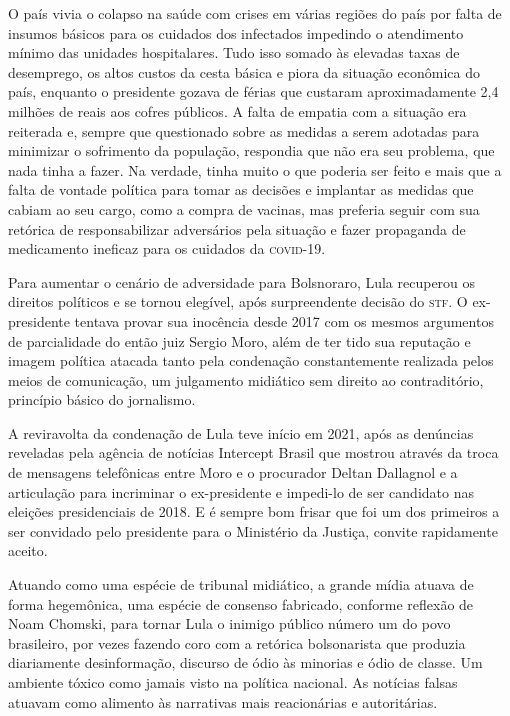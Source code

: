 O país vivia o colapso na saúde com crises em várias regiões do país por
falta de insumos básicos para os cuidados dos infectados impedindo o
atendimento mínimo das unidades hospitalares. Tudo isso somado às
elevadas taxas de desemprego, os altos custos da cesta básica e piora da
situação econômica do país, enquanto o presidente gozava de férias que
custaram aproximadamente 2,4 milhões de reais aos cofres públicos. A falta de
empatia com a situação era reiterada e, sempre que questionado sobre
as medidas a serem adotadas para minimizar o sofrimento da população,
respondia que não era seu problema, que nada tinha a fazer. Na verdade,
tinha muito o que poderia ser feito e mais que a falta de vontade
política para tomar as decisões e implantar as medidas que cabiam ao seu
cargo, como a compra de vacinas, mas preferia seguir com sua retórica de
responsabilizar adversários pela situação e fazer propaganda de
medicamento ineficaz para os cuidados da \textsc{covid-19}.

Para aumentar o cenário de adversidade para Bolsnoraro, Lula recuperou
os direitos políticos e se tornou elegível, após surpreendente decisão
do \textsc{stf}. O ex-presidente tentava provar sua inocência desde 2017 com os
mesmos argumentos de parcialidade do então juiz Sergio Moro, além de ter tido
sua reputação e imagem política atacada tanto pela condenação
constantemente realizada pelos meios de comunicação, um julgamento
midiático sem direito ao contraditório, princípio básico do jornalismo.

A reviravolta da condenação de Lula teve início em 2021, após as
denúncias reveladas pela agência de notícias Intercept Brasil que
mostrou através da troca de mensagens telefônicas entre Moro e o
procurador Deltan Dallagnol e a articulação para incriminar o
ex-presidente e impedi-lo de ser candidato nas eleições presidenciais de
2018. E é sempre bom frisar que foi um dos primeiros a ser convidado
pelo presidente para o Ministério da Justiça, convite rapidamente
aceito.

Atuando como uma espécie de tribunal midiático, a grande mídia atuava de
forma hegemônica, uma espécie de consenso fabricado, conforme reflexão
de Noam Chomski, para tornar Lula o inimigo público número um do povo
brasileiro, por vezes fazendo coro com a retórica bolsonarista que
produzia diariamente desinformação, discurso de ódio às minorias e ódio
de classe. Um ambiente tóxico como jamais visto na política nacional. As
notícias falsas atuavam como alimento às narrativas mais reacionárias e
autoritárias.

